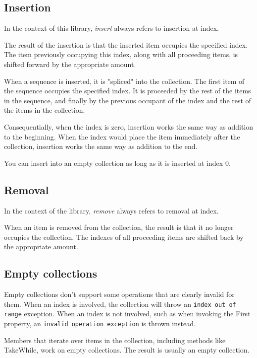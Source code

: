 \documentclass[]{article}
\newcommand{\codeformat}{\ttfamily}
\newcommand{\methodformat}{\codeformat\color{MidnightBlue}}
\newcommand{\method}[1]{{\methodformat #1}}
\begin{document}
\subsection{Insertion}\label{sec:ops-insertion}
In the context of this library, \emph{insert} always refers to insertion at index. 

The result of the insertion is that the inserted item occupies the specified index. The item previously occupying this index, along with all proceeding items, is shifted forward by the appropriate amount. 

When a sequence is inserted, it is "spliced" into the collection. The first item of the sequence occupies the specified index. It is proceeded by the rest of the items in the sequence, and finally by the previous occupant of the index and the rest of the items in the collection.

Consequentially, when the index is zero, insertion works the same way as addition to the beginning. When the index would place the item immediately after the collection, insertion works the same way as addition to the end.

You can insert into an empty collection as long as it is inserted at index 0.

\subsection{Removal}\label{sec:ops-removal}
In the context of the library, \emph{remove} always refers to removal at index.

When an item is removed from the collection, the result is that it no longer occupies the collection. The indexes of all proceeding items are shifted back by the appropriate amount.

\subsection{Empty collections}\label{sec:ops-empty}
Empty collections don't support some operations that are clearly invalid for them. When an index is involved, the collection will throw an \texttt{index out of range} exception. When an index is not involved, such as when invoking the \method{First} property, an \texttt{invalid operation exception} is thrown instead.

Members that iterate over items in the collection, including methods like \method{TakeWhile}, work on empty collections. The result is usually an empty collection.
\end{document}
